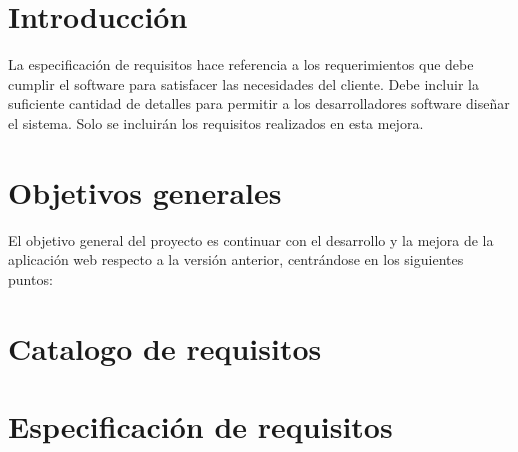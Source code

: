 
\section{Introducción}
La especificación de requisitos hace referencia a los requerimientos que debe cumplir el software para satisfacer las necesidades del cliente. Debe incluir la suficiente cantidad de detalles para permitir a los desarrolladores software diseñar el sistema.
Solo se incluirán los requisitos realizados en esta mejora.
\section{Objetivos generales}
El objetivo general del proyecto es continuar con el desarrollo y la mejora de la aplicación web respecto a la versión anterior, centrándose en los siguientes puntos:

\section{Catalogo de requisitos}

\section{Especificación de requisitos}


